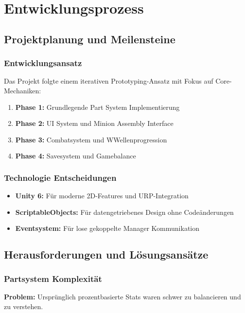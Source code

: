 \chapter{Entwicklungsprozess}
\label{chap:entwicklungsprozess}

\section{Projektplanung und Meilensteine}

\subsection{Entwicklungsansatz}
Das Projekt folgte einem iterativen Prototyping-Ansatz mit Fokus auf Core-Mechaniken:

\begin{enumerate}
    \item \textbf{Phase 1:} Grundlegende Part System Implementierung
    \item \textbf{Phase 2:} UI System und Minion Assembly Interface
    \item \textbf{Phase 3:} Combatsystem und WWellenprogression
    \item \textbf{Phase 4:} Savesystem und Gamebalance
\end{enumerate}

\subsection{Technologie Entscheidungen}
\begin{itemize}
    \item \textbf{Unity 6:} Für moderne 2D-Features und URP-Integration
    \item \textbf{ScriptableObjects:} Für datengetriebenes Design ohne Codeänderungen
    \item \textbf{Eventsystem:} Für lose gekoppelte Manager Kommunikation
\end{itemize}

\section{Herausforderungen und Lösungsansätze}

\subsection{Partsystem Komplexität}
\textbf{Problem:} Ursprünglich prozentbasierte Stats waren schwer zu balancieren und zu verstehen.

